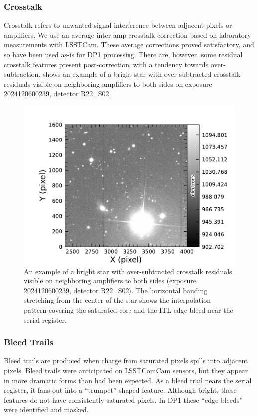 \subsubsection{Crosstalk}
Crosstalk refers to unwanted signal interference between adjacent pixels or amplifiers.
We use an average inter-amp crosstalk correction based on laboratory measurements with LSSTCam.
These average corrections proved satisfactory, and so have been used as-is for DP1 processing.
There are, however, some residual crosstalk features present post-correction, with a tendency towards over-subtraction.
 shows an example  of a bright star with over-subtracted crosstalk residuals visible on neighboring amplifiers to both sides on exposure 2024120600239, detector R22\_S02.
\begin{figure}[htb!]
  \centering
  \includegraphics[width=0.98\linewidth]{dp1_isr_anomalies-crosstalk_residual}
  \caption{An example of a bright star with over-subtracted crosstalk residuals visible on neighboring amplifiers to both sides (exposure 2024120600239, detector R22\_S02).
  The horizontal banding stretching from the center of the star shows the interpolation pattern covering the saturated core and the ITL edge bleed near the serial register.}
  \label{fig:crosstalk_residual}
\end{figure}

\subsubsection{Bleed Trails}
Bleed trails are produced when charge from saturated pixels spills into adjacent pixels.
Bleed trails were anticipated on LSSTComCam sensors, but they appear in more dramatic forms than had been expected.
As a bleed trail nears the serial register, it fans out into a ``trumpet'' shaped feature.
Although bright, these features do not have consistently saturated pixels.
In DP1 these ``edge bleeds'' were  identified and masked.

